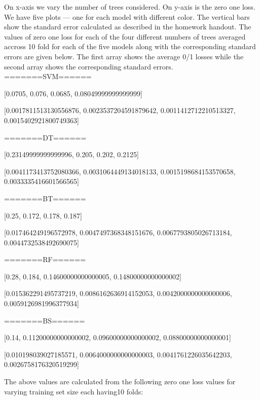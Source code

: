 \documentclass[12pt]{article}
\begin{document}
On x-axis we vary the number of trees considered. On y-axis is the zero one loss. 
We have five plots --- one for each model with different color. The vertical 
bars show the standard error calculated as described in the homework handout. The 
values of zero one loss for each of the four different numbers of trees averaged accross 10 fold for 
each of the five models along with the corresponding standard errors are given below. The
first array shows the average 0/1 losses while the second array shows the corresponding 
standard errors.
\\
=======SVM======

[0.0705, 0.076, 0.0685, 0.08049999999999999]

[0.0017811513130556876, 0.0023537204591879642, 0.0011412712210513327, 0.0015402921800749363]

=======DT======

[0.23149999999999996, 0.205, 0.202, 0.2125]

[0.0041173413752080366, 0.0031064449134018133, 0.0015198684153570658, 0.0033335416601566565]

=======BT======

[0.25, 0.172, 0.178, 0.187]

[0.017464249196572978, 0.0047497368348151676, 0.0067793805026713184, 0.0044732538492690075]

=======RF======

[0.28, 0.184, 0.14600000000000005, 0.14800000000000002]

[0.015362291495737219, 0.0086162636914152053, 0.0042000000000000006, 0.0059126981996377934]

=======BS======

[0.14, 0.11200000000000002, 0.09600000000000002, 0.08800000000000001]

[0.010198039027185571, 0.0064000000000000003, 0.0041761226035642203, 0.0026758176320519299]


The above values are calculated from the following zero one loss values for varying training
set size each having10 folds:
\\
\end{document}

